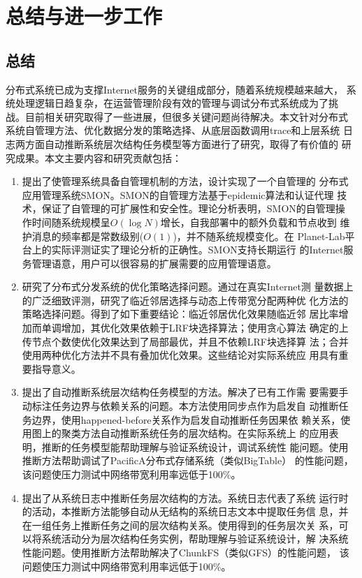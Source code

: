 \chapter{总结与进一步工作}
\label{chap:conclusion}

\section{总结}

分布式系统已成为支撑Internet服务的关键组成部分，随着系统规模越来越大，
系统处理逻辑日趋复杂，在运营管理阶段有效的管理与调试分布式系统成为了挑
战。目前相关研究取得了一些进展，但很多关键问题尚待解决。本文针对分布式
系统自管理方法、优化数据分发的策略选择、从底层函数调用trace和上层系统
日志两方面自动推断系统层次结构任务模型等方面进行了研究，取得了有价值的
研究成果。本文主要内容和研究贡献包括：

\begin{enumerate}
  
    \item 提出了使管理系统具备自管理机制的方法，设计实现了一个自管理的
    分布式应用管理系统SMON。SMON的自管理方法基于epidemic算法和认证代理
    技术，保证了自管理的可扩展性和安全性。理论分析表明，SMON的自管理操
    作时间随系统规模呈$O(\log N)$增长，自我部署中的额外负载和节点收到
    维护消息的频率都是常数级别($O(1)$)，并不随系统规模变化。在
    Planet-Lab平台上的实际评测证实了理论分析的正确性。SMON支持长期运行
    的Internet服务管理语意，用户可以很容易的扩展需要的应用管理语意。

    \item 研究了分布式分发系统的优化策略选择问题。通过在真实Internet测
    量数据上的广泛细致评测，研究了临近邻居选择与动态上传带宽分配两种优
    化方法的策略选择问题。得到了如下重要结论：临近邻居优化效果随临近邻
    居比率增加而单调增加，其优化效果依赖于LRF块选择算法；使用贪心算法
    确定的上传节点个数使优化效果达到了局部最优，并且不依赖LRF块选择算
    法；合并使用两种优化方法并不具有叠加优化效果。这些结论对实际系统应
    用具有重要指导意义。

    \item 提出了自动推断系统层次结构任务模型的方法。解决了已有工作需
    要需要手动标注任务边界与依赖关系的问题。本方法使用同步点作为启发自
    动推断任务边界，使用happened-before关系作为启发自动推断任务因果依
    赖关系，使用图上的聚类方法自动推断系统任务的层次结构。在实际系统上
    的应用表明，推断的任务模型能帮助理解与验证系统设计，调试系统性
    能问题。使用推断方法帮助调试了PacificA分布式存储系统（类似BigTable）
    的性能问题，该问题使压力测试中网络带宽利用率远低于100\%。

    \item 提出了从系统日志中推断任务层次结构的方法。系统日志代表了系统
    运行时的活动，本推断方法能够自动从无结构的系统日志文本中提取任务信
    息，并在一组任务上推断任务之间的层次结构关系。使用得到的任务层次关
    系，可以将系统活动分为层次结构任务实例，帮助理解与验证系统设计，解
    决系统性能问题。使用推断方法帮助解决了ChunkFS（类似GFS）的性能问题，
    该问题使压力测试中网络带宽利用率远低于100\%。

\end{enumerate}

